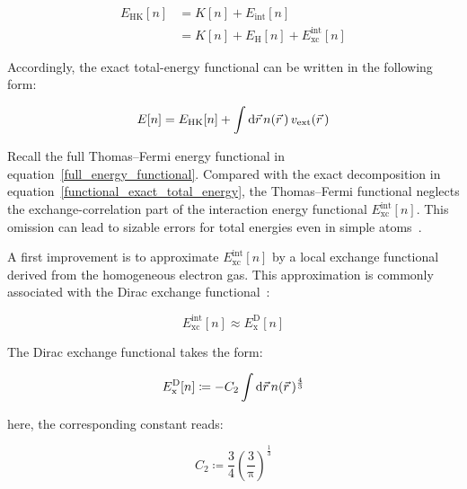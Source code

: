 \begin{equation}
\begin{aligned}
    E_\mathrm{HK}[n] &= K[n] + E_\mathrm{int}[n] \\
    &= K[n]+E_\mathrm{H}[n]+E_\mathrm{xc}^\mathrm{int}[n]
\end{aligned}
\label{HK_decomposition_Hartree_xc}
\end{equation}

Accordingly, the exact total-energy functional can be written in the following form:

\begin{equation}
    E[n]=E_\mathrm{HK}[n]+\int\mathrm{d}{\vec{r}}\,n(\vec{r}\,)\,v_\mathrm{ext}(\vec{r}\,)
\label{functional_exact_total_energy_HK_form}
\end{equation}

Recall the full Thomas--Fermi energy functional in equation~\eqref{full_energy_functional}.
Compared with the exact decomposition in equation~\eqref{functional_exact_total_energy},
the Thomas--Fermi functional neglects the exchange-correlation part of the interaction energy functional $E_\mathrm{xc}^\mathrm{int}[n]$.
This omission can lead to sizable errors for total energies even in simple atoms~\cite{schwinger1980thomas, schwinger1981thomas}.

A first improvement is to approximate $E_\mathrm{xc}^\mathrm{int}[n]$ by a local exchange functional derived from the homogeneous electron gas.
This approximation is commonly associated with the Dirac exchange functional~\cite{dirac1930note}:

\begin{equation}
    E_\mathrm{xc}^\mathrm{int}[n]\approx E_\mathrm{x}^\mathrm{D}[n]
\label{Dirac_exchange_approximation}
\end{equation}

The Dirac exchange functional takes the form:

\begin{equation}
    E_\mathrm{x}^\mathrm{D}[n]\coloneqq -C_2\int\mathrm{d}{\vec{r}}\,n(\vec{r}\,)^{\frac{4}{3}}
\label{Dirac_exchange_functional}
\end{equation}

here, the corresponding constant reads:

\begin{equation}
    C_2 \coloneqq \frac{3}{4}\left(\frac{3}{\mathrm{\pi}}\right)^{\frac{1}{3}}
\label{Dirac_exchange_constant}
\end{equation}

